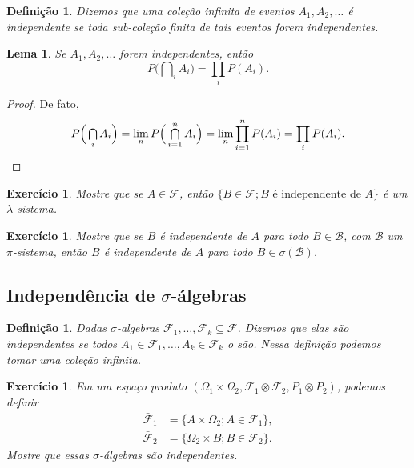 \documentclass[reqno, final]{book}
\newcommand*\1{\mathds{1}}
\newtheorem{lemma}[theorem]{Lema}
\newtheorem{definition}[theorem]{Definição}
\newtheorem{exercise}[example]{Exercício}
\DeclareMathOperator*{\mcap}{{\textstyle \bigcap}}
\begin{document}
\begin{definition}
  Dizemos que uma coleção infinita de eventos $A_1, A_2, \dots$ é independente  se toda sub-coleção finita de tais eventos forem independentes.
\end{definition}

\begin{lemma}
  Se $A_1, A_2, \dots$ forem independentes, então
  \begin{equation}
    P\Big( \mcap_{i} A_i \Big) = \prod\limits_{i} P(A_i).
  \end{equation}
\end{lemma}

\begin{proof}
  De fato,
  \begin{equation*}
    P\Big( \mcap_{i} A_i \Big) = \lim_n P\Big( \mcap_{i = 1}^n A_i \Big) = \lim_n \prod\limits_{i=1}^n P(A_i) = \prod\limits_{i} P(A_i). \qedhere
  \end{equation*}
\end{proof}

\begin{exercise}
  Mostre que se $A \in \mathcal{F}$, então $\{B \in \mathcal{F}; B \text{ é independente de } A\}$ é um $\lambda$-sistema.
\end{exercise}

\begin{exercise}
  Mostre que se $B$ é independente de $A$ para todo $B \in \mathcal{B}$, com $\mathcal{B}$ um $\pi$-sistema, então $B$ é independente de $A$ para todo $B \in \sigma(\mathcal{B})$.
\end{exercise}

\subsection{Independência de \texorpdfstring{$\sigma$}{sigma}-álgebras}

\begin{definition}
  Dadas $\sigma$-algebras $\mathcal{F}_1, \dots, \mathcal{F}_k \subseteq \mathcal{F}$.
  Dizemos que elas são independentes  se todos $A_1 \in \mathcal{F}_1, \dots, A_k \in \mathcal{F}_k$ o são.
  Nessa definição podemos tomar uma coleção infinita.
\end{definition}

\begin{exercise}
  Em um espaço produto $(\Omega_1 \times \Omega_2, \mathcal{F}_1 \otimes \mathcal{F}_2, P_1 \otimes P_2)$, podemos definir
  \begin{equation}
    \begin{split}
      \bar{\mathcal{F}}_1 & = \{A \times \Omega_2; A \in \mathcal{F}_1\},\\
      \bar{\mathcal{F}}_2 & = \{\Omega_2 \times B; B \in \mathcal{F}_2\}.
    \end{split}
  \end{equation}
  Mostre que essas $\sigma$-álgebras são independentes.
\end{exercise}
\end{document}
